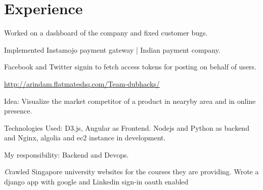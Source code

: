 \documentclass[]{deedy-resume-openfont}
\begin{document}
\begin{minipage}[t]{0.66\textwidth}


\section{Experience}

\vspace{\topsep} %
\begin{tightemize}
\item Worked on a dashboard of the company and fixed customer bugs.
\item Implemented Instamojo payment gateway | Indian payment company.
\item Facebook and Twitter signin to fetch access tokens for posting on behalf of users.
\vspace{\topsep} %
\end{tightemize}

{ \url{http://arindam.flatmateshq.com/Team-dubhacks/} }\\
\begin{tightemize}
\item Idea: Visualize the market competitor of a product in nearyby area and in online presence.
\item Technologies Used: D3.js, Angular as Frontend. Nodejs and Python as backend and Nginx, algolia and ec2 instance in development.
\item My responsibility: Backend and Devops.
\vspace{\topsep} %
\end{tightemize}

\begin{tightemize}
\item \emph Crawled Singapore university websites for the courses they are providing. Wrote a django app with google and Linkedin sign-in oauth enabled \end{tightemize}
\sectionsep


\end{minipage}
\end{document}
